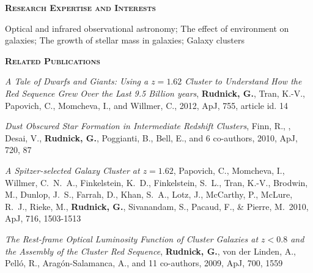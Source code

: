 \documentclass[11pt]{article}
\begin{document}
\begin{flushleft}
\vspace{-0.1in}
{\large {\bf \textsc{Research Expertise and Interests}}
\hrulefill}
\end{flushleft}

Optical and infrared observational astronomy; The effect of environment on galaxies; The growth of stellar mass in galaxies; Galaxy clusters

\begin{flushleft}
\vspace{-0.1in}
{\large {\bf \textsc{Related Publications}}
\hrulefill}
\end{flushleft}

\vspace{-0.07in}
\hangindent=1.5cm  
{\it A Tale of Dwarfs and Giants: Using a $z=1.62$ Cluster to
  Understand How the Red Sequence Grew Over the Last 9.5 Billion
  years}, {{\bf {Rudnick}, G.}, {Tran}, K.-V., {Papovich}, C.,
  {Momcheva}, I., and {Willmer}, C.}, 2012, ApJ, 755, article id. 14

\hangindent=1.5cm  
{\it Dust Obscured Star Formation in Intermediate Redshift Clusters}, Finn, R., , Desai, V., {\bf
  Rudnick, G.}, Poggianti, B., Bell, E., and 6 co-authors, 2010, ApJ, 720, 87

\hangindent=1.5cm  
{\it A Spitzer-selected Galaxy Cluster at $z = 1.62$}, Papovich, C.,
Momcheva, I., Willmer, C.~N.~A., Finkelstein, K.~D., Finkelstein,
S.~L., Tran, K.-V., Brodwin, M., Dunlop, J.~S., Farrah, D., Khan,
S.~A., Lotz, J., McCarthy, P., McLure, R.~J., Rieke, M., {\bf Rudnick, G.},
Sivanandam, S., Pacaud, F., \& Pierre, M.\ 2010, ApJ, 716, 1503-1513

\hangindent=1.5cm  
{\it The Rest-frame Optical Luminosity Function of Cluster Galaxies at
  $z < 0.8$ and the Assembly of the Cluster Red Sequence}, {\bf Rudnick,
  G.}, {von der Linden}, A., {Pell{\'o}}, R.,
{Arag{\'o}n-Salamanca}, A., and 11 co-authors, 2009, ApJ, 700, 1559
\end{document}
